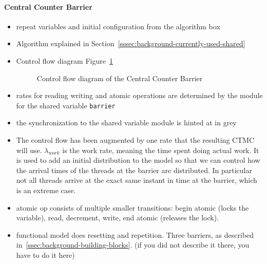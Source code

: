 \documentclass[a4paper, 10pt]{article}
\begin{document}
\paragraph{Central Counter Barrier}
\label{sssec:analysis-modelchecking-modelling-central-counter}
\begin{itemize}
	\item repeat variables and initial configuration from the algorithm box
	\item Algorithm explained in Section~\ref{sssec:background-currently-used-shared}
	\item Control flow diagram Figure~\ref{fig:model-central-counter}
		\begin{figure}[htbp]
			\centering
			
			\caption{Control flow diagram of the Central Counter Barrier}
			\label{fig:model-central-counter}
		\end{figure}
	\item rates for reading writing and atomic operations are determined by the module for the shared variable \texttt{barrier}
	\item the synchronization to the shared variable module is hinted at in grey
	\item The control flow has been augmented by one rate that the resulting CTMC will use. $\lambda_{work}$ is the work rate, meaning the time spent doing actual work. It is used to add an initial distribution to the model so that we can control how the arrival times of the threads at the barrier are distributed. In particular not all threads arrive at the exact same instant in time at the barrier, which is an extreme case.
	\item atomic op consists of multiple smaller transitions: begin atomic (locks the variable), read, decrement, write, end atomic (releases the lock).
	\item functional model does resetting and repetition. Three barriers, as described in~\ref{ssec:background-building-blocks}. (if you did not describe it there, you have to do it here)
\end{itemize}

\end{document}
